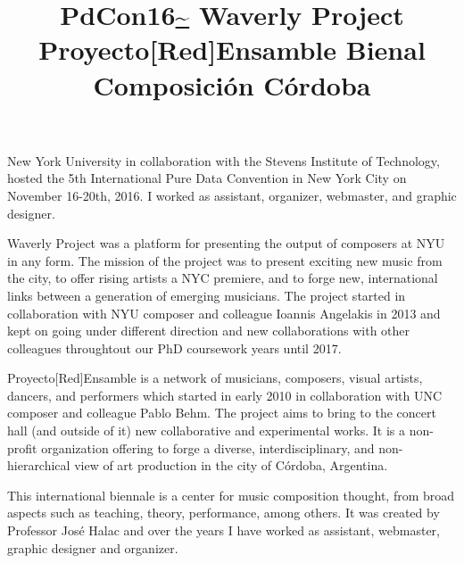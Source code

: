 \title{ PdCon16\url{~} }
\begin{position} 
New York University in collaboration with the Stevens Institute of Technology, hosted the 5th International Pure Data Convention in New York City on November 16-20th, 2016. I worked as assistant, organizer, webmaster, and graphic designer.
\end{position}

\title{ Waverly Project }
\begin{position}
Waverly Project was a platform for presenting the output of composers at NYU in any form. The mission of the project was to present exciting new music from the city, to offer rising artists a NYC premiere, and to forge new, international links between a generation of emerging musicians. The project started in collaboration with NYU composer and colleague Ioannis Angelakis in 2013 and kept on going under different direction and new collaborations with other colleagues throughtout our PhD coursework years until 2017.
\end{position}

\title{ Proyecto[Red]Ensamble }
\begin{position} 
Proyecto[Red]Ensamble is a network of musicians, composers, visual artists, dancers, and performers which started in early 2010 in collaboration with UNC composer and colleague Pablo Behm. The project aims to bring to the concert hall (and outside of it) new collaborative and experimental works. It is a non-profit organization offering to forge a diverse, interdisciplinary, and non-hierarchical view of art production in the city of Córdoba, Argentina.
\end{position}

\title{ Bienal Composición Córdoba }
\begin{position} 
This international biennale is a center for music composition thought, from broad aspects such as teaching, theory, performance, among others. It was created by Professor José Halac and over the years I have worked as assistant, webmaster, graphic designer and organizer.
\end{position}